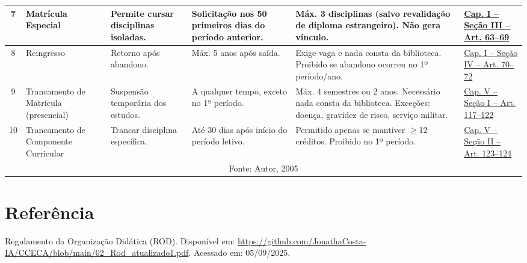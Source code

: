 \documentclass[authoryear]{elsarticle}
\begin{document}
\begin{longtable}{|c|p{3cm}|p{3cm}|p{3.5cm}|p{3.5cm}|p{2cm}|}
		\hline
		7 & Matrícula Especial & Permite cursar disciplinas isoladas. & Solicitação nos 50 primeiros dias do período anterior. & Máx. 3 disciplinas (salvo revalidação de diploma estrangeiro). Não gera vínculo. & \href{https://github.com/JonathaCosta-IA/CCECA/blob/main/02_Rod_atualizado1.pdf}{Cap. I – Seção III – Art. 63--69} \\
		\hline
		8 & Reingresso & Retorno após abandono. & Máx. 5 anos após saída. & Exige vaga e nada consta da biblioteca. Proibido se abandono ocorreu no 1º período/ano. & \href{https://github.com/JonathaCosta-IA/CCECA/blob/main/02_Rod_atualizado1.pdf}{Cap. I – Seção IV – Art. 70--72} \\
		\hline
		9 & Trancamento de Matrícula (presencial) & Suspensão temporária dos estudos. & A qualquer tempo, exceto no 1º período. & Máx. 4 semestres ou 2 anos. Necessário nada consta da biblioteca. Exceções: doença, gravidez de risco, serviço militar. & \href{https://github.com/JonathaCosta-IA/CCECA/blob/main/02_Rod_atualizado1.pdf}{Cap. V – Seção I – Art. 117--122} \\
		\hline
		10 & Trancamento de Componente Curricular & Trancar disciplina específica. & Até 30 dias após início do período letivo. & Permitido apenas se mantiver $\geq$12 créditos. Proibido no 1º período. & \href{https://github.com/JonathaCosta-IA/CCECA/blob/main/02_Rod_atualizado1.pdf}{Cap. V – Seção II – Art. 123--124} \\
		\hline
		\multicolumn{6}{|c|}{\scriptsize Fonte: Autor, 2005} \\
	\end{longtable}
	\section*{Referência}
	Regulamento da Organização Didática (ROD). Disponível em: 
	\url{https://github.com/JonathaCosta-IA/CCECA/blob/main/02_Rod_atualizado1.pdf}. Acessado em: 05/09/2025.
	
\end{document}
